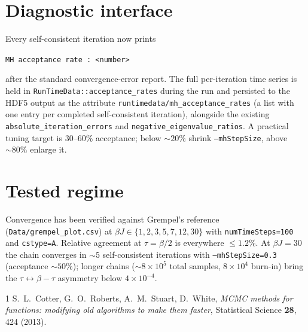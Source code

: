 \documentclass[11pt]{article}
\newcommand{\file}[1]{\texttt{#1}}
\newcommand{\code}[1]{\texttt{#1}}
\begin{document}
\section{Diagnostic interface}\label{sec:diag}

Every self-consistent iteration now prints

\begin{center}
\code{MH acceptance rate            : <number>}
\end{center}

after the standard convergence-error report.  The full per-iteration time series
is held in \code{RunTimeData::acceptance\_rates} during the run and persisted to
the HDF5 output as the attribute
\code{runtimedata/mh\_acceptance\_rates} (a list with one entry per completed
self-consistent iteration), alongside the existing
\code{absolute\_iteration\_errors} and \code{negative\_eigenvalue\_ratios}.  A
practical tuning target is $30$--$60\%$ acceptance; below $\sim 20\%$ shrink
\code{--mhStepSize}, above $\sim 80\%$ enlarge it.

\section{Tested regime}

Convergence has been verified against Grempel's reference (\file{Data/grempel\_plot.csv})
at $\beta J \in \{1, 2, 3, 5, 7, 12, 30\}$ with \code{numTimeSteps=100} and
\code{cstype=A}.  Relative agreement at $\tau=\beta/2$ is everywhere
$\le 1.2\%$.  At $\beta J = 30$ the chain converges in $\sim 5$ self-consistent
iterations with \code{--mhStepSize=0.3} (acceptance $\sim 50\%$); longer chains
($\sim 8 \times 10^5$ total samples, $8\times 10^4$ burn-in) bring the
$\tau \leftrightarrow \beta{-}\tau$ asymmetry below $4\times 10^{-4}$.

\begin{thebibliography}{1}
S.~L.~Cotter, G.~O.~Roberts, A.~M.~Stuart, D.~White,
\textit{MCMC methods for functions: modifying old algorithms to make them faster},
Statistical Science \textbf{28}, 424 (2013).
\end{thebibliography}
\end{document}
